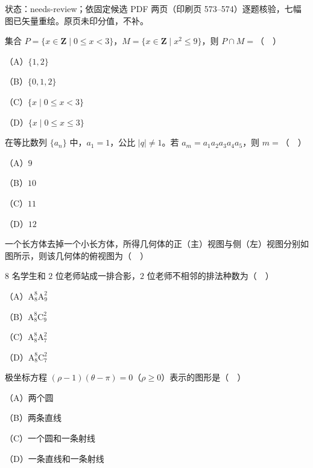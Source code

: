 

状态：needs-review；依固定候选 PDF 两页（印刷页 573–574）逐题核验，七幅图已矢量重绘。原页未印分值，不补。


\begin{question}
集合 $P=\{x\in\mathbf Z\mid0\leqslant x<3\}$，$M=\{x\in\mathbf Z\mid x^2\leqslant9\}$，则 $P\cap M=$（　）

（A）$\{1,2\}$

（B）$\{0,1,2\}$

（C）$\{x\mid0\leqslant x<3\}$

（D）$\{x\mid0\leqslant x\leqslant3\}$

\end{question}
\begin{question}
在等比数列 $\{a_n\}$ 中，$a_1=1$，公比 $|q|\neq1$。若 $a_m=a_1a_2a_3a_4a_5$，则 $m=$（　）

（A）$9$

（B）$10$

（C）$11$

（D）$12$

\Needspace{0.4\textheight}
\end{question}
\begingroup
\renewenvironment{question}{\Needspace{0.5\textheight}}{}
\begin{question}
一个长方体去掉一个小长方体，所得几何体的正（主）视图与侧（左）视图分别如图所示，则该几何体的俯视图为（　）
\nopagebreak[4]
\begin{center}\end{center}
\nopagebreak[4]
\end{question}
\endgroup
\begin{question}
$8$ 名学生和 $2$ 位老师站成一排合影，$2$ 位老师不相邻的排法种数为（　）

（A）$\mathrm A_8^8\mathrm A_9^2$

（B）$\mathrm A_8^8\mathrm C_9^2$

（C）$\mathrm A_8^8\mathrm A_7^2$

（D）$\mathrm A_8^8\mathrm C_7^2$

\end{question}
\begin{question}
极坐标方程 $(\rho-1)(\theta-\pi)=0$（$\rho\geqslant0$）表示的图形是（　）

（A）两个圆

（B）两条直线

（C）一个圆和一条射线

（D）一条直线和一条射线

\end{question}
